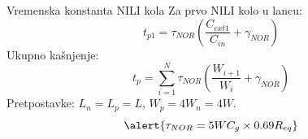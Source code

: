 \begin{frame}[label=09_3-s039]{Vremenska konstanta NILI kola}
Za prvo NILI kolo u lancu:\[t_{p1}=\tau_{NOR}\left(\frac{C_{ext1}}{C_{in}}+\gamma_{NOR}\right)\]
Ukupno kašnjenje:
\[t_p=\sum_{i=1}^N\tau_{NOR}\left(\frac{W_{i+1}}{W_i}+\gamma_{NOR}\right)\]
Pretpostavke: $L_n=L_p=L$, $W_p=4W_n=4W$.
\[\alert{\tau_{NOR}=5WC_g\times0.69R_{eq}}\]
\end{frame}
